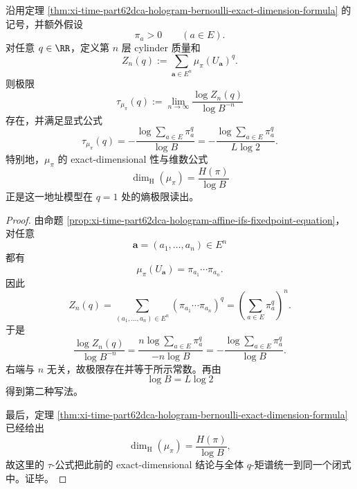 \begin{theorem}\label{thm:xi-time-part62dca-hologram-bernoulli-lq-spectrum}
沿用定理 \ref{thm:xi-time-part62dca-hologram-bernoulli-exact-dimension-formula} 的记号，并额外假设
\[
\pi_a>0
\qquad
(a\in E).
\]
对任意 \(q\in\RR\)，定义第 \(n\) 层 cylinder 质量和
\[
Z_n(q):=\sum_{\mathbf a\in E^n}\mu_\pi(U_{\mathbf a})^q.
\]
则极限
\[
\tau_{\mu_\pi}(q)
:=
\lim_{n\to\infty}\frac{\log Z_n(q)}{\log B^{-n}}
\]
存在，并满足显式公式
\[
\boxed{\;
\tau_{\mu_\pi}(q)
=
-\frac{\log\sum_{a\in E}\pi_a^q}{\log B}
=
-\frac{\log\sum_{a\in E}\pi_a^q}{L\log 2}.\;}
\]
特别地，\(\mu_\pi\) 的 exact-dimensional 性与维数公式
\[
\dim_{\mathrm H}(\mu_\pi)=\frac{H(\pi)}{\log B}
\]
正是这一地址模型在 \(q=1\) 处的熵极限读出。
\end{theorem}
\begin{proof}
由命题 \ref{prop:xi-time-part62dca-hologram-affine-ifs-fixedpoint-equation}，对任意
\[
\mathbf a=(a_1,\dots,a_n)\in E^n
\]
都有
\[
\mu_\pi(U_{\mathbf a})=\pi_{a_1}\cdots \pi_{a_n}.
\]
因此
\[
Z_n(q)
=
\sum_{(a_1,\dots,a_n)\in E^n}(\pi_{a_1}\cdots \pi_{a_n})^q
=
\left(\sum_{a\in E}\pi_a^q\right)^n.
\]
于是
\[
\frac{\log Z_n(q)}{\log B^{-n}}
=
\frac{n\log\sum_{a\in E}\pi_a^q}{-n\log B}
=
-\frac{\log\sum_{a\in E}\pi_a^q}{\log B}.
\]
右端与 \(n\) 无关，故极限存在并等于所示常数。再由
\[
\log B=L\log 2
\]
得到第二种写法。

最后，定理 \ref{thm:xi-time-part62dca-hologram-bernoulli-exact-dimension-formula} 已经给出
\[
\dim_{\mathrm H}(\mu_\pi)=\frac{H(\pi)}{\log B},
\]
故这里的 \(\tau\)-公式把此前的 exact-dimensional 结论与全体 \(q\)-矩谱统一到同一个闭式中。证毕。
\end{proof}

